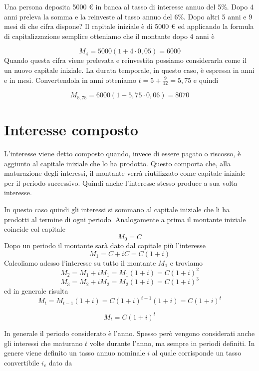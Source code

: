 \begin{exrig}
\begin{esempio}
Una persona deposita 5000 € in banca al tasso di interesse annuo del 5\%. Dopo 
4 anni preleva la somma e la reinveste al tasso annuo del 6\%. Dopo altri 5 
anni 
e 9 mesi di che cifra dispone?
Il capitale iniziale è di 5000 € ed applicando la formula di capitalizzazione 
semplice otteniamo che il montante dopo 4 anni è

$$M_4 = 5000(1+4\cdot0,05) = 6000$$
Quando questa cifra viene prelevata e reinvestita possiamo considerarla come il 
un nuovo capitale iniziale. La durata temporale, in questo caso, è espressa in 
anni e in mesi. Convertendola in anni otteniamo $t = 5 +\frac{9}{12} = 5,75$ e 
quindi

$$M_{5,75} = 6000(1+5,75\cdot0,06) = 8070$$
\end{esempio}
\end{exrig}

\section{Interesse composto}

L'interesse viene detto composto quando, invece di essere pagato o riscosso, è 
aggiunto al capitale iniziale che lo ha prodotto. Questo comporta che, alla 
maturazione degli interessi, il montante verrà riutilizzato come capitale 
iniziale per il periodo successivo. Quindi anche l'interesse stesso produce a sua volta interesse.

In questo caso quindi gli interessi si sommano al capitale iniziale che li ha 
prodotti al termine di ogni periodo.
Analogamente a prima il montante iniziale coincide col capitale
$$ M_{0}=C $$
Dopo un periodo il montante sarà dato dal capitale più l'interesse
$$M_{1}=C+iC=C(1+i)$$
Calcoliamo adesso l'interesse su tutto il montante $M_1$ e troviamo
$$M_{2}=M_1+iM_1=M_1(1+i)=C(1+i)^2$$
$$M_{3}=M_2+iM_2=M_2(1+i)=C(1+i)^3$$
ed in generale risulta
$$M_{t}=M_{t-1}(1+i) = C(1+i)^{t-1}(1+i)=C(1+i)^{t}$$

\begin{definizione}
$$ M_{t}=C(1+i)^t $$
\end{definizione}

In generale il periodo considerato è l'anno. Spesso però vengono considerati 
anche gli interessi che maturano $t$ volte durante l'anno, ma sempre in periodi 
definiti. In genere viene definito un tasso annuo nominale $i$ al quale 
corrisponde un tasso convertibile $i_c$ dato da

